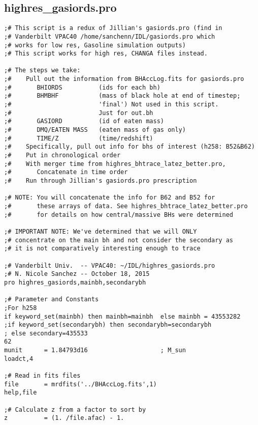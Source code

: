 \documentclass[12pt,headA,chapB]{fiskthesis}
\begin{document}
\newpage
\subsection{highres\_gasiords.pro}
\begin{verbatim}
;# This script is a redux of Jillian's gasiords.pro (find in
;# Vanderbilt VPAC40 /home/sanchenn/IDL/gasiords.pro which
;# works for low res, Gasoline simulation outputs) 
;# This script works for high res, CHANGA files instead. 

;# The steps we take:
;#    Pull out the information from BHAccLog.fits for gasiords.pro
;#       BHIORDS          (ids for each bh)
;#       BHMBHF           (mass of black hole at end of timestep;
;#                        'final') Not used in this script. 
;#                        Just for out.bh
;#       GASIORD          (id of eaten mass)
;#       DMQ/EATEN MASS   (eaten mass of gas only)
;#       TIME/Z           (time/redshift)
;#    Specifically, pull out info for bhs of interest (h258: B52&B62)
;#    Put in chronological order
;#    With merger time from highres_bhtrace_latez_better.pro,
;#       Concatenate in time order
;#    Run through Jillian's gasiords.pro prescription

;# NOTE: You will concatenate the info for B62 and B52 for 
;#       these arrays of data. See highres_bhtrace_latez_better.pro 
;#       for details on how central/massive BHs were determined

;# IMPORTANT NOTE: We've determined that we will ONLY
;# concentrate on the main bh and not consider the secondary as
;# it is not comparatively interesting enough to trace

;# Vanderbilt Univ.  -- VPAC40: ~/IDL/highres_gasiords.pro
;# N. Nicole Sanchez -- October 18, 2015
pro highres_gasiords,mainbh,secondarybh
  
;# Parameter and Constants
;For h258 
if keyword_set(mainbh) then mainbh=mainbh  else mainbh = 43553282 
;if keyword_set(secondarybh) then secondarybh=secondarybh 
; else secondary=435533
62
munit      = 1.84793d16                    ; M_sun
loadct,4

;# Read in fits files
file       = mrdfits('../BHAccLog.fits',1)
help,file

;# Calculate z from a factor to sort by
z          = (1. /file.afac) - 1.


\end{verbatim}
\end{document}
